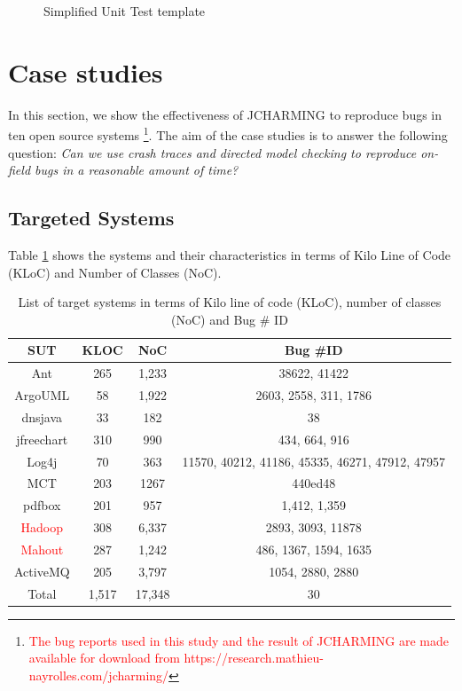 \documentclass[times, doublespace]{smrauth}
\newcommand{\red}[1]{\textcolor{red}{#1}}
\begin{document}
{\begin{figure}[h!]

\noindent\fbox{%
    \parbox{\textwidth}{%
    
}%
}

    \caption{Simplified Unit Test template
    \label{fig:jcharming-unittemplate}}
\end{figure}

\section{Case studies\label{sec:cases}}

In this section, we show the effectiveness of JCHARMING to
reproduce bugs in ten open source systems
\footnote{\red{The bug reports used in this study and the result of JCHARMING are
made available for download from https://research.mathieu-nayrolles.com/jcharming/}}. The aim of the
case studies is to answer the following question: {\it Can we use
crash traces and directed model checking to reproduce on-
field bugs in a reasonable amount of time?}

\subsection{Targeted Systems}

Table \ref{tab:jacharming-systems} shows the systems and their characteristics in terms of
Kilo Line of Code (KLoC) and Number of Classes (NoC).

\begin{table}
\centering

\caption{List of target systems in terms of Kilo line of code (KLoC), number of classes (NoC) and Bug \# ID}
\begin{tabular}{c|c|c|c}
SUT        & KLOC & NoC  & Bug \#ID                                        \\ \hline \hline
Ant        & 265  & 1,233 & 38622, 41422                                    \\
ArgoUML    & 58   & 1,922 & 2603, 2558, 311, 1786                           \\
dnsjava    & 33   & 182  & 38                                              \\
jfreechart & 310  & 990  & 434, 664, 916                                   \\
Log4j      & 70   & 363  & 11570, 40212, 41186, 45335, 46271, 47912, 47957 \\
MCT        & 203  & 1267 & 440ed48                                         \\
pdfbox     & 201  & 957  & 1,412, 1,359 \\
\red{Hadoop} 	   & 308   & 6,337 & 2893, 3093, 11878\\
\red{Mahout} 	   & 287  & 1,242 &  486, 1367, 1594, 1635\\
ActiveMQ   & 205  & 3,797 & 1054, 2880, 2880\\ \hline
Total      & 1,517 & 17,348 & 30 \\
\hline \hline
\end{tabular}
\label{tab:jacharming-systems}
\end{table}


}
\end{document}
